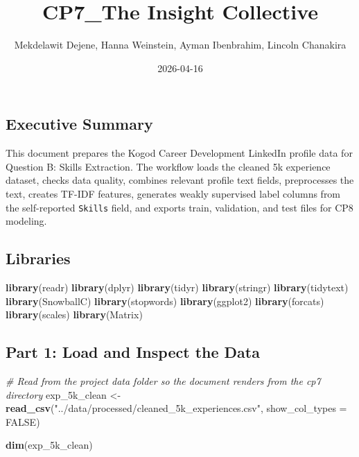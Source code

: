 \documentclass[
]{article}
\title{CP7\_The Insight Collective}
\author{Mekdelawit Dejene, Hanna Weinstein, Ayman Ibenbrahim, Lincoln
Chanakira}
\date{2026-04-16}
\newenvironment{Shaded}{\begin{snugshade}}{\end{snugshade}}
\newcommand{\AttributeTok}[1]{\textcolor[rgb]{0.13,0.29,0.53}{#1}}
\newcommand{\CommentTok}[1]{\textcolor[rgb]{0.56,0.35,0.01}{\textit{#1}}}
\newcommand{\ConstantTok}[1]{\textcolor[rgb]{0.56,0.35,0.01}{#1}}
\newcommand{\FunctionTok}[1]{\textcolor[rgb]{0.13,0.29,0.53}{\textbf{#1}}}
\newcommand{\NormalTok}[1]{#1}
\newcommand{\OtherTok}[1]{\textcolor[rgb]{0.56,0.35,0.01}{#1}}
\newcommand{\StringTok}[1]{\textcolor[rgb]{0.31,0.60,0.02}{#1}}
\begin{document}
\maketitle

\subsection{Executive Summary}\label{executive-summary}

This document prepares the Kogod Career Development LinkedIn profile
data for Question B: Skills Extraction. The workflow loads the cleaned
5k experience dataset, checks data quality, combines relevant profile
text fields, preprocesses the text, creates TF-IDF features, generates
weakly supervised label columns from the self-reported \texttt{Skills}
field, and exports train, validation, and test files for CP8 modeling.

\subsection{Libraries}\label{libraries}

\begin{Shaded}
\begin{Highlighting}[]
\FunctionTok{library}\NormalTok{(readr)}
\FunctionTok{library}\NormalTok{(dplyr)}
\FunctionTok{library}\NormalTok{(tidyr)}
\FunctionTok{library}\NormalTok{(stringr)}
\FunctionTok{library}\NormalTok{(tidytext)}
\FunctionTok{library}\NormalTok{(SnowballC)}
\FunctionTok{library}\NormalTok{(stopwords)}
\FunctionTok{library}\NormalTok{(ggplot2)}
\FunctionTok{library}\NormalTok{(forcats)}
\FunctionTok{library}\NormalTok{(scales)}
\FunctionTok{library}\NormalTok{(Matrix)}
\end{Highlighting}
\end{Shaded}

\subsection{Part 1: Load and Inspect the
Data}\label{part-1-load-and-inspect-the-data}

\begin{Shaded}
\begin{Highlighting}[]
\CommentTok{\# Read from the project data folder so the document renders from the cp7 directory}
\NormalTok{exp\_5k\_clean }\OtherTok{\textless{}{-}} \FunctionTok{read\_csv}\NormalTok{(}\StringTok{"../data/processed/cleaned\_5k\_experiences.csv"}\NormalTok{, }\AttributeTok{show\_col\_types =} \ConstantTok{FALSE}\NormalTok{)}

\FunctionTok{dim}\NormalTok{(exp\_5k\_clean)}
\end{Highlighting}
\end{Shaded}
\end{document}
